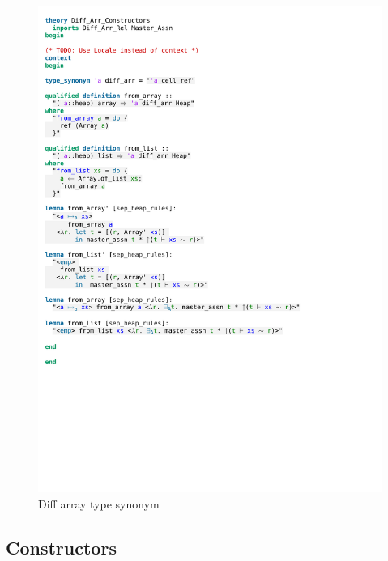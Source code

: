 \begin{figure}[htpb]
    \includegraphics[trim={0 24,9cm 0 4,1cm}, clip, width=1.00\textwidth]{figures/Theory_Diff_Arr_Constructors.pdf}
    \caption[Diff array type synonym]{Diff array type synonym}
    \label{fig:diff_arr_type_synonym}
\end{figure}

\subsection{Constructors}

